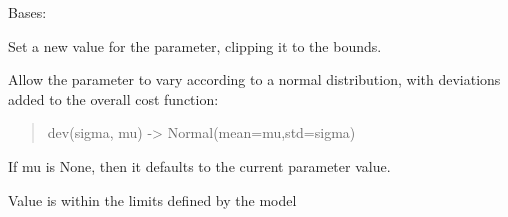 \documentclass[letterpaper,10pt,english]{sphinxmanual}
\begin{document}
\begin{fulllineitems}
\label{api/mystic.parameter:refl1d.mystic.parameter.IntegerParameter}
Bases: {\hyperref[api/mystic.parameter:refl1d.mystic.parameter.Parameter]{}}

\begin{fulllineitems}
\label{api/mystic.parameter:refl1d.mystic.parameter.IntegerParameter.clip_set}
Set a new value for the parameter, clipping it to the bounds.

\end{fulllineitems}


\begin{fulllineitems}
\label{api/mystic.parameter:refl1d.mystic.parameter.IntegerParameter.default}
\end{fulllineitems}


\begin{fulllineitems}
\label{api/mystic.parameter:refl1d.mystic.parameter.IntegerParameter.dev}
Allow the parameter to vary according to a normal distribution, with
deviations added to the overall cost function:
\begin{quote}

dev(sigma, mu) -\textgreater{} Normal(mean=mu,std=sigma)
\end{quote}

If mu is None, then it defaults to the current parameter value.

\end{fulllineitems}


\begin{fulllineitems}
\label{api/mystic.parameter:refl1d.mystic.parameter.IntegerParameter.feasible}
Value is within the limits defined by the model


\end{fulllineitems}
\end{fulllineitems}
\end{document}
